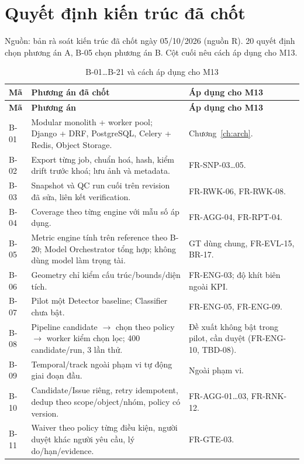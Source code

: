 \chapter{Quyết định kiến trúc đã chốt}
\label{app:decisions}
Nguồn: bản rà soát kiến trúc đã chốt ngày 05/10/2026 (nguồn R). 20 quyết định
chọn phương án A, B-05 chọn phương án B. Cột cuối nêu cách áp dụng cho M13.

\begin{xltabular}{\linewidth}{@{}L{1.1cm}L{4.6cm}Y@{}}
\caption{B-01…B-21 và cách áp dụng cho M13}\label{tab:decisions}\\
\toprule
\textbf{Mã} & \textbf{Phương án đã chốt} & \textbf{Áp dụng cho M13}\\
\midrule
\endfirsthead
\toprule \textbf{Mã} & \textbf{Phương án} & \textbf{Áp dụng cho M13}\\ \midrule
\endhead
\bottomrule
\endfoot
B-01 & Modular monolith + worker pool; Django + DRF, PostgreSQL, Celery + Redis, Object Storage. & Chương~\ref{ch:arch}.\\
B-02 & Export từng job, chuẩn hoá, hash, kiểm drift trước khoá; lưu ảnh và metadata. & FR-SNP-03…05.\\
B-03 & Snapshot và QC run cuối trên revision đã sửa, liên kết verification. & FR-RWK-06, FR-RWK-08.\\
B-04 & Coverage theo từng engine với mẫu số áp dụng. & FR-AGG-04, FR-RPT-04.\\
B-05 & Metric engine tính trên reference theo B-20; Model Orchestrator tổng hợp; không dùng model làm trọng tài. & GT dùng chung, FR-EVL-15, BR-17.\\
B-06 & Geometry chỉ kiểm cấu trúc/bounds/diện tích. & FR-ENG-03; độ khít biên ngoài KPI.\\
B-07 & Pilot một Detector baseline; Classifier chưa bật. & FR-ENG-05, FR-ENG-09.\\
B-08 & Pipeline candidate $\rightarrow$ chọn theo policy $\rightarrow$ worker kiểm chọn lọc; 400 candidate/run, 3 lần thử. & Đề xuất không bật trong pilot, cần duyệt (FR-ENG-10, TBD-08).\\
B-09 & Temporal/track ngoài phạm vi tự động giai đoạn đầu. & Ngoài phạm vi.\\
B-10 & Candidate/Issue riêng, retry idempotent, dedup theo scope/object/nhóm, policy có version. & FR-AGG-01…03, FR-RNK-12.\\
B-11 & Waiver theo policy từng điều kiện, người duyệt khác người yêu cầu, lý do/hạn/evidence. & FR-GTE-03.\\

\end{xltabular}
